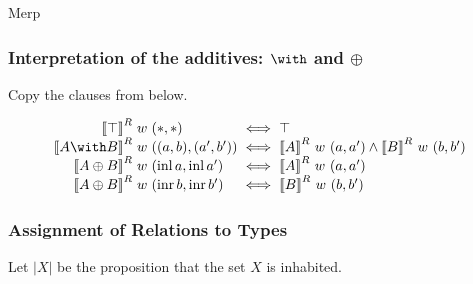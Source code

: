 \begin{example}[Distances]
  Merp
\end{example}

\subsubsection{Interpretation of the additives: $\with$ and $\oplus$}

Copy the clauses from below.

\begin{displaymath}
  \arraycolsep=1.5pt
  \begin{array}{rllcl}
    \sem{\top}^R & w & (*,*) &\iff& \top \\
    \sem{A \with B}^R & w & ((a,b),(a',b')) &\iff&
    \sem{A}^R~w~(a,a') \wedge \sem{B}^R~w~(b,b') \\
    \sem{A \oplus B}^R & w & (\operatorname{inl} a,\operatorname{inl} a')
                               &\iff& \sem{A}^R~w~(a,a') \\
    \sem{A \oplus B}^R & w & (\operatorname{inr} b,\operatorname{inr} b')
                               &\iff& \sem{B}^R~w~(b,b') \\
  \end{array}
\end{displaymath}


\subsubsection{Assignment of Relations to Types}

Let $\left| X \right|$ be the proposition that the set $X$ is
inhabited.



